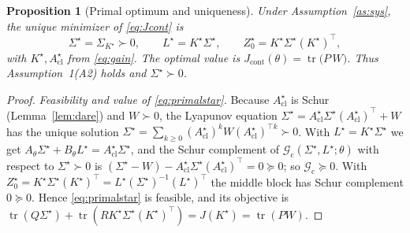 \documentclass[11pt]{article}
\newtheorem{proposition}{Proposition}
\theoremstyle{definition}
\DeclareMathOperator{\tr}{tr}
\newcommand{\Acl}{A_{\mathrm{cl}}}
\newcommand{\Th}{\theta}
\newcommand{\Sig}{\Sigma}
\begin{document}
\begin{proposition}[Primal optimum and uniqueness]\label{prop:primalopt}
Under Assumption~\ref{as:sys}, the unique minimizer of \eqref{eq:Jcont} is
\begin{equation}\label{eq:primalstar}
\Sig^\star=\Sig_{K^\star}\succ0,\qquad
L^\star=K^\star\Sig^\star,\qquad
Z_0^\star=K^\star\Sig^\star(K^\star)^\top,
\end{equation}
with $K^\star,\Acl^\star$ from \eqref{eq:gain}. The optimal value is
$J_{\mathrm{cont}}(\Th)=\tr\!\big(P\,W\big)$. Thus Assumption~1(A2) holds and
$\Sig^\star\succ0$.
\end{proposition}

\begin{proof}
\emph{Feasibility and value of \eqref{eq:primalstar}.} Because $\Acl^\star$ is
Schur (Lemma~\ref{lem:dare}) and $W\succ0$, the Lyapunov equation
$\Sig^\star=\Acl^\star\Sig^\star(\Acl^\star)^\top+W$ has the unique solution
$\Sig^\star=\sum_{k\ge0}(\Acl^\star)^kW(\Acl^\star)^{\top k}\succ0$. With
$L^\star=K^\star\Sig^\star$ we get $A_\Th\Sig^\star+B_\Th L^\star
=\Acl^\star\Sig^\star$, and the Schur complement of
$\mathcal G_{\mathrm c}(\Sig^\star,L^\star;\Th)$ with respect to $\Sig^\star\succ0$
is $(\Sig^\star-W)-\Acl^\star\Sig^\star(\Acl^\star)^\top=0\succeq0$; so
$\mathcal G_{\mathrm c}\succeq0$. With $Z_0^\star=K^\star\Sig^\star(K^\star)^\top
=L^\star(\Sig^\star)^{-1}(L^\star)^\top$ the middle block has Schur complement
$0\succeq0$. Hence \eqref{eq:primalstar} is feasible, and its objective is
$\tr(Q\Sig^\star)+\tr(RK^\star\Sig^\star(K^\star)^\top)=J(K^\star)=\tr(PW)$.


\end{proof}
\end{document}
